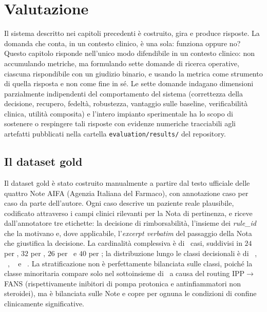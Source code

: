 \chapter{Valutazione}
\label{ch:valutazione}

Il sistema descritto nei capitoli precedenti è costruito, gira e produce
risposte. La domanda che conta, in un contesto clinico, è una sola:
funziona oppure no? Questo capitolo risponde nell'unico modo
difendibile in un contesto clinico: non accumulando metriche, ma
formulando sette domande di ricerca operative, ciascuna rispondibile
con un giudizio binario, e usando la metrica come strumento di quella
risposta e non come fine in sé. Le sette domande indagano dimensioni
parzialmente indipendenti del comportamento del sistema (correttezza
della decisione, recupero, fedeltà, robustezza, vantaggio sulle baseline,
verificabilità clinica, utilità composita) e l'intero impianto
sperimentale ha lo scopo di sostenere o respingere tali risposte con
evidenze numeriche tracciabili agli artefatti pubblicati nella cartella
\texttt{evaluation/results/} del repository.

\section{Il dataset gold}
\label{sec:gold}

Il dataset gold è stato costruito manualmente a partire dal testo ufficiale delle quattro Note AIFA (Agenzia Italiana del Farmaco), con annotazione caso per caso da parte dell'autore. Ogni caso descrive un paziente reale plausibile, codificato attraverso i campi clinici rilevanti per la Nota di pertinenza, e riceve dall'annotatore tre etichette: la decisione di rimborsabilità, l'insieme dei \emph{rule\_id} che la motivano e, dove applicabile, l'\emph{excerpt verbatim} del passaggio della Nota che giustifica la decisione. La cardinalità complessiva è di \goldn\ casi, suddivisi in $24$ per \notezero, $32$ per \notetredici, $26$ per \notesessanta\ e $40$ per \notenova; la distribuzione lungo le classi decisionali è di \goldRimb\ , \goldNonRimb\ , \goldNonDet\  e \goldRouted\ . La stratificazione non è perfettamente bilanciata sulle classi, poiché la classe minoritaria  compare solo nel sottoinsieme di \notezero\ a causa del routing IPP$\to$FANS (rispettivamente inibitori di pompa protonica e antinfiammatori non steroidei), ma è bilanciata sulle Note e copre per ognuna le condizioni di confine clinicamente significative.

